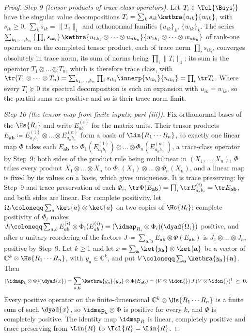 \begin{proof}
\emph{Step 9 (tensor products of trace-class operators).} Let
$T_i\in\Tcl{\Bsys'_i}$ have the singular value decompositions
$T_i=\sum_ks_{ik}\ketbra{u_{ik}}{w_{ik}}$, with $s_{ik}\ge0$,
$\sum_ks_{ik}=\|T_i\|_1$ and orthonormal families $\{u_{ik}\}_k$,
$\{w_{ik}\}_k$. The series
$\sum_{k_1,\dots,k_n}\big(\prod_is_{ik_i}\big)\,
\ketbra{u_{1k_1}\otimes\dots\otimes u_{nk_n}}{w_{1k_1}\otimes\dots\otimes w_{nk_n}}$
of rank-one operators on the completed tensor product, each of trace norm
$\prod_is_{ik_i}$, converges absolutely in trace norm, its sum of norms being
$\prod_i\|T_i\|_1$; its sum is the operator $T_1\otimes\dots\otimes T_n$,
which is therefore trace class, with
$\tr(T_1\otimes\dots\otimes T_n)=\sum_{k_1,\dots,k_n}\prod_is_{ik_i}
\innerp{w_{ik_i}}{u_{ik_i}}=\prod_i\tr T_i$. Where every $T_i\succeq0$ its
spectral decomposition is such an expansion with $u_{ik}=w_{ik}$, so the
partial sums are positive and so is their trace-norm limit.

\emph{Step 10 (the tensor map from finite inputs, part (iii)).} Fix
orthonormal bases of the $\Hs{R_i}$ and write $E^{(i)}_{ab}$ for the matrix
units. Their tensor products $E_{\mathbf{a}\mathbf{b}}\coloneqq
E^{(1)}_{a_1b_1}\otimes\dots\otimes E^{(n)}_{a_nb_n}$ form a basis of
$\Lin{R_1\cdots R_n}$, so exactly one linear map $\Phi$ takes each
$E_{\mathbf{a}\mathbf{b}}$ to
$\Phi_1(E^{(1)}_{a_1b_1})\otimes\dots\otimes\Phi_n(E^{(n)}_{a_nb_n})$, a
trace-class operator by Step~9; both sides of the product rule being
multilinear in $(X_1,\dots,X_n)$, $\Phi$ takes every product
$X_1\otimes\dots\otimes X_n$ to $\Phi_1(X_1)\otimes\dots\otimes\Phi_n(X_n)$,
and a linear map is fixed by its values on a basis, which gives uniqueness.
It is trace preserving: by Step~9 and trace preservation of each $\Phi_i$,
$\tr\Phi(E_{\mathbf{a}\mathbf{b}})=\prod_i\tr E^{(i)}_{a_ib_i}
=\tr E_{\mathbf{a}\mathbf{b}}$, and both sides are linear. For complete
positivity, let $\Omega_i\coloneqq\sum_a\ket{a}\otimes\ket{a}$ on two copies
of $\Hs{R_i}$; complete positivity of $\Phi_i$ makes
$J_i\coloneqq\sum_{a,b}E^{(i)}_{ab}\otimes\Phi_i(E^{(i)}_{ab})
=(\idmap_{R_i}\otimes\Phi_i)(\dyad{\Omega_i})$ positive, and after a unitary
reordering of the factors
$J\coloneqq\sum_{\mathbf{a},\mathbf{b}}E_{\mathbf{a}\mathbf{b}}\otimes
\Phi(E_{\mathbf{a}\mathbf{b}})$ is $J_1\otimes\dots\otimes J_n$, positive by
Step~9. Let $k\ge1$ and let $x=\sum_{\mathbf{a}}\ket{y_{\mathbf{a}}}\otimes
\ket{\mathbf{a}}$ be a vector of $\mathbb{C}^k\otimes\Hs{R_1\cdots R_n}$, with
$y_{\mathbf{a}}\in\mathbb{C}^k$, and put
$V\coloneqq\sum_{\mathbf{a}}\ketbra{y_{\mathbf{a}}}{\mathbf{a}}$. Then
\begin{equation*}
  (\idmap_k\otimes\Phi)(\dyad{x})
  =\sum_{\mathbf{a},\mathbf{b}}\ketbra{y_{\mathbf{a}}}{y_{\mathbf{b}}}\otimes
   \Phi(E_{\mathbf{a}\mathbf{b}})
  =(V\otimes\idon{})\,J\,(V\otimes\idon{})^{\dagger}\;\succeq\;0 .
\end{equation*}
Every positive operator on the finite-dimensional
$\mathbb{C}^k\otimes\Hs{R_1\cdots R_n}$ is a finite sum of such $\dyad{x}$, so
$\idmap_k\otimes\Phi$ is positive for every $k$, and $\Phi$ is completely
positive. The identity map $\idmap_R$ is linear, completely positive and
trace preserving from $\Lin{R}$ to $\Tcl{R}=\Lin{R}$.
\end{proof}
